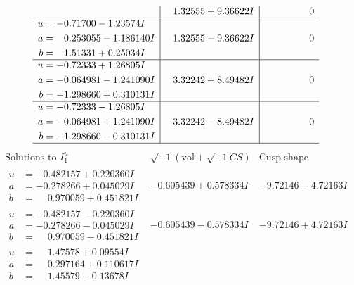 \documentclass[1p]{elsarticle_modified}
\theoremstyle{definition}
\newcommand{\I}{\sqrt{-1}}
\begin{document}
$$\begin{array}{c|c|c}
 & \phantom{-}1.32555 + 9.36622 I & \phantom{-0.000000 } 0 \\ \hline\begin{aligned}
u &= -0.71700 - 1.23574 I \\
a &= \phantom{-}0.253055 - 1.186140 I \\
b &= \phantom{-}1.51331 + 0.25034 I\end{aligned}
 & \phantom{-}1.32555 - 9.36622 I & \phantom{-0.000000 } 0 \\ \hline\begin{aligned}
u &= -0.72333 + 1.26805 I \\
a &= -0.064981 - 1.241090 I \\
b &= -1.298660 + 0.310131 I\end{aligned}
 & \phantom{-}3.32242 + 8.49482 I & \phantom{-0.000000 } 0 \\ \hline\begin{aligned}
u &= -0.72333 - 1.26805 I \\
a &= -0.064981 + 1.241090 I \\
b &= -1.298660 - 0.310131 I\end{aligned}
 & \phantom{-}3.32242 - 8.49482 I & \phantom{-0.000000 } 0\\
 \hline 
 \end{array}$$\newpage$$\begin{array}{c|c|c}  
\text{Solutions to }I^u_{1}& \I (\text{vol} + \sqrt{-1}CS) & \text{Cusp shape}\\
 \hline 
\begin{aligned}
u &= -0.482157 + 0.220360 I \\
a &= -0.278266 + 0.045029 I \\
b &= \phantom{-}0.970059 + 0.451821 I\end{aligned}
 & -0.605439 + 0.578334 I & -9.72146 - 4.72163 I \\ \hline\begin{aligned}
u &= -0.482157 - 0.220360 I \\
a &= -0.278266 - 0.045029 I \\
b &= \phantom{-}0.970059 - 0.451821 I\end{aligned}
 & -0.605439 - 0.578334 I & -9.72146 + 4.72163 I \\ \hline\begin{aligned}
u &= \phantom{-}1.47578 + 0.09554 I \\
a &= \phantom{-}0.297164 + 0.110617 I \\
b &= \phantom{-}1.45579 - 0.13678 I\end{aligned}

\end{array}$$
\end{document}
